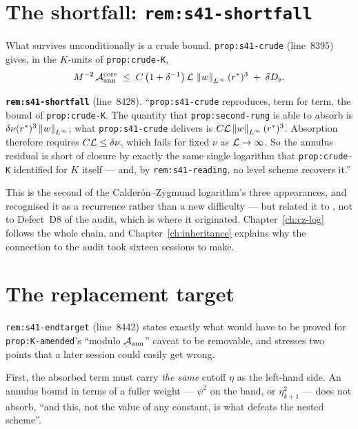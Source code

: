 \section{\texorpdfstring{The shortfall: \texttt{rem:s41-shortfall}}{The shortfall}}
\label{sec:s41-shortfall}

What survives unconditionally is a crude bound.
\texttt{prop:s41-crude} (line~8395) gives, in the \(K\)-units of
\texttt{prop:crude-K},
\[
  M^{-2}\,\mathcal{A}_{\mathrm{ann}}^{\mathrm{core}}
  \;\le\; C\left(1+\delta^{-1}\right)\mathcal{L}\,\left\|w\right\|_{L^\infty}(r^{*})^3
    \;+\;\delta D_\flat .
\]

\begin{record}
\textbf{\texttt{rem:s41-shortfall}} (line~8428).
``\texttt{prop:s41-crude} reproduces, term for term, the bound of
\texttt{prop:crude-K}. The quantity that \texttt{prop:second-rung} is able to
absorb is \(\delta\nu(r^{*})^3\left\|w\right\|_{L^\infty}\); what
\texttt{prop:s41-crude} delivers is \(C\mathcal{L}\left\|w\right\|_{L^\infty}(r^{*})^3\).
Absorption therefore requires \(C\mathcal{L}\le\delta\nu\), which fails for fixed
\(\nu\) as \(\mathcal{L}\to\infty\). So the annulus residual is short of closure by
exactly the same single logarithm that \texttt{prop:crude-K} identified for
\(K\) itself --- and, by \texttt{rem:s41-reading}, no level scheme recovers
it.''
\end{record}

This is the second of the Calder\'on--Zygmund logarithm's three appearances,
and  recognised it as a recurrence rather than a new difficulty --- but
related it to , not to Defect~D8 of the audit, which is where it
originated. Chapter~\ref{ch:cz-log} follows the whole chain, and
Chapter~\ref{ch:inheritance} explains why the connection to the audit took
sixteen sessions to make.

\section{The replacement target}
\label{sec:band-target}

\texttt{rem:s41-endtarget} (line~8442) states exactly what would have to be
proved for \texttt{prop:K-amended}'s ``modulo \(\mathcal{A}_{\mathrm{ann}}\)'' caveat to be
removable, and stresses two points that a later session could easily get
wrong.

First, the absorbed term must carry \emph{the same} cutoff \(\eta\) as the
left-hand side. An annulus bound in terms of a fuller weight --- \(\psi^2\) on
the band, or \(\eta_{k+1}^2\) --- does not absorb, ``and this, not the value of
any constant, is what defeats the nested scheme''.

